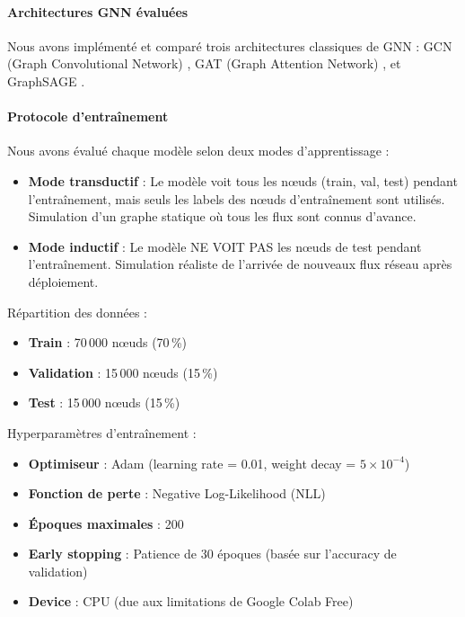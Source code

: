 ﻿\documentclass[11pt,a4paper]{article}
\begin{document}
\paragraph{Architectures GNN évaluées}

Nous avons implémenté et comparé trois architectures classiques de GNN : GCN (Graph Convolutional Network) \cite{kipf2017semi}, GAT (Graph Attention Network) \cite{velickovic2018graph}, et GraphSAGE \cite{hamilton2017inductive}.

\paragraph{Protocole d'entraînement}

Nous avons évalué chaque modèle selon deux modes d'apprentissage :

\begin{itemize}
    \item \textbf{Mode transductif} : Le modèle voit tous les nœuds (train, val, test) pendant l'entraînement, mais seuls les labels des nœuds d'entraînement sont utilisés. Simulation d'un graphe statique où tous les flux sont connus d'avance.
    
    \item \textbf{Mode inductif} : Le modèle NE VOIT PAS les nœuds de test pendant l'entraînement. Simulation réaliste de l'arrivée de nouveaux flux réseau après déploiement.
\end{itemize}

Répartition des données :
\begin{itemize}
    \item \textbf{Train} : 70\,000 nœuds (70\,\%)
    \item \textbf{Validation} : 15\,000 nœuds (15\,\%)
    \item \textbf{Test} : 15\,000 nœuds (15\,\%)
\end{itemize}

Hyperparamètres d'entraînement :
\begin{itemize}
    \item \textbf{Optimiseur} : Adam (learning rate = 0.01, weight decay = $5 \times 10^{-4}$)
    \item \textbf{Fonction de perte} : Negative Log-Likelihood (NLL)
    \item \textbf{Époques maximales} : 200
    \item \textbf{Early stopping} : Patience de 30 époques (basée sur l'accuracy de validation)
    \item \textbf{Device} : CPU (due aux limitations de Google Colab Free)
\end{itemize}
\end{document}
